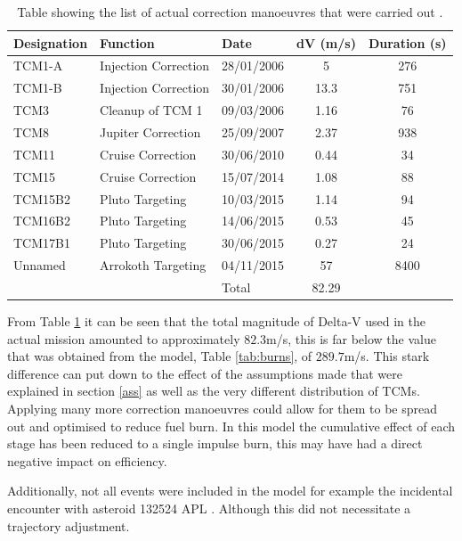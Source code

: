 \documentclass[11pt]{article}
\begin{document}
\begin{table}[H]
\centering
\caption{Table showing the list of actual correction manoeuvres that were carried out \cite{jupperi}\cite{utburn}.}
\begin{tabular}{lllcc}
\hline
\rowcolor[HTML]{CBCEFB} 
Designation & Function             & Date       & dV (m/s) & Duration (s) \\ \hline
TCM1-A      & Injection Correction & 28/01/2006 & 5        & 276          \\
TCM1-B      & Injection Correction & 30/01/2006 & 13.3     & 751          \\
TCM3        & Cleanup of TCM 1     & 09/03/2006 & 1.16     & 76           \\
TCM8        & Jupiter Correction   & 25/09/2007 & 2.37     & 938          \\
TCM11       & Cruise Correction    & 30/06/2010 & 0.44     & 34           \\
TCM15       & Cruise Correction    & 15/07/2014 & 1.08     & 88           \\
TCM15B2     & Pluto Targeting      & 10/03/2015 & 1.14     & 94           \\
TCM16B2     & Pluto Targeting      & 14/06/2015 & 0.53     & 45           \\
TCM17B1     & Pluto Targeting      & 30/06/2015 & 0.27     & 24           \\
Unnamed     & Arrokoth Targeting   & 04/11/2015 & 57       & 8400         \\ \hline
            &                      & Total      & 82.29    &              \\ \hline
\end{tabular}
\label{tab:realtcm}
\end{table}

From Table \ref{tab:realtcm} it can be seen that the total magnitude of Delta-V used in the actual mission amounted to approximately $82.3$m/s, this is far below the value that was obtained from the model, Table \ref{tab:burns}, of $289.7$m/s. This stark difference can put down to the effect of the assumptions made that were explained in section \ref{ass} as well as the very different distribution of TCMs. Applying many more correction manoeuvres could allow for them to be spread out and optimised to reduce fuel burn. In this model the cumulative effect of each stage has been reduced to a single impulse burn, this may have had a direct negative impact on efficiency. 

Additionally, not all events were included in the model for example the incidental encounter with asteroid 132524 APL \cite{jupperi}. Although this did not necessitate a trajectory adjustment. 
\end{document}
